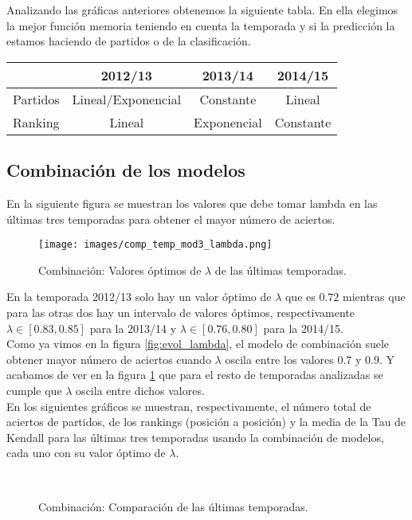Analizando las gráficas anteriores obtenemos la siguiente tabla. En ella elegimos la mejor función memoria teniendo en cuenta la temporada y si la predicción la estamos haciendo de partidos o de la clasificación.

\begin{center}
	\begin{tabular}{|c|c|c|c|}
		\hline &  2012/13 &  2013/14 &  2014/15 \\ 
		\hline Partidos & Lineal/Exponencial &  Constante &  Lineal \\ 
		\hline Ranking  &  Lineal &  Exponencial &  Constante \\ 
		\hline 
	\end{tabular} 
\end{center}

\subsection{Combinación de los modelos}
En la siguiente figura se muestran los valores que debe tomar lambda en las últimas tres temporadas para obtener el mayor número de aciertos.

\begin{figure}[H]
	\centering
	\texttt{[image: images/comp\_temp\_mod3\_lambda.png]}
	\caption{Combinación: Valores óptimos de $\lambda$ de las últimas temporadas.} \label{fig:lambda_temp}
\end{figure}

En la temporada 2012/13 solo hay un valor óptimo de $\lambda$ que es $0.72$ mientras que para las otras dos hay un intervalo de valores óptimos, respectivamente $\lambda \in [0.83,0.85]$ para la 2013/14 y $\lambda \in [0.76,0.80]$ para la 2014/15.\\

Como ya vimos en la figura \ref{fig:evol_lambda}, el modelo de combinación suele obtener mayor número de aciertos cuando $\lambda$ oscila entre los valores $0.7$ y $0.9$. Y acabamos de ver en la figura \ref{fig:lambda_temp} que para el resto de temporadas analizadas se cumple que $\lambda$ oscila entre dichos valores. \\

En los siguientes gráficos se muestran, respectivamente, el número total de aciertos de partidos, de los rankings (posición a posición) y la media de la Tau de Kendall para las últimas tres temporadas usando la combinación de modelos, cada uno con su valor óptimo de $\lambda$.

\begin{figure}[H]
	\centering
	\\
	\caption{Combinación: Comparación de las últimas temporadas.}
\end{figure} 

